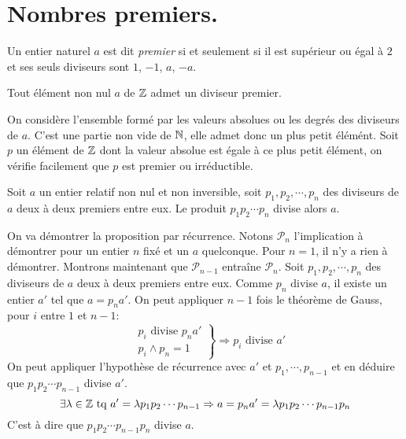 \section{Nombres premiers.}
\begin{defi}
 Un entier naturel $a$ est dit \emph{premier} si et seulement si il est supérieur ou égal à $2$ et ses seuls diviseurs sont $1$, $-1$, $a$, $-a$.
\end{defi}
\begin{prop}
 Tout élément non nul $a$ de $\mathbb{Z}$ admet un diviseur premier.
\end{prop}
\begin{demo}
 On considère l'ensemble formé par les valeurs absolues ou les degrés des diviseurs de $a$. C'est une partie non vide de $\mathbb{N}$, elle admet donc un plus petit élémént. Soit $p$ un élément de $\mathbb{Z}$ dont la valeur absolue est égale à ce plus petit élément, on vérifie facilement que $p$ est premier ou irréductible. 
\end{demo}
\begin{prop}
 Soit $a$ un entier relatif non  nul et non inversible, soit $p_1, p_2, \cdots, p_n$ des diviseurs de $a$ deux à deux premiers entre eux. Le produit $p_1p_2\cdots p_n$ divise alors $a$.
\end{prop}
\begin{demo}
On va démontrer la proposition par récurrence. Notons $\mathcal{P}_n$ l'implication à démontrer pour un entier $n$ fixé et un $a$ quelconque.\newline
Pour $n=1$, il n'y a rien à démontrer. Montrons maintenant que $\mathcal{P}_{n-1}$ entraîne $\mathcal{P}_n$.\newline
Soit $p_1, p_2, \cdots, p_n$ des diviseurs de $a$ deux à deux premiers entre eux. Comme $p_n$ divise $a$, il existe un entier $a'$ tel que $a=p_na'$. On peut appliquer $n-1$ fois le théorème de Gauss, pour $i$ entre $1$ et $n-1$:
\begin{displaymath}
\left. 
\begin{aligned}
&p_i \text{ divise } p_na'\\ &p_i \wedge p_n = 1  
\end{aligned}
\right\rbrace \Rightarrow p_i \text{ divise } a'
\end{displaymath}
On peut appliquer l'hypothèse de récurrence avec $a'$ et $p_1,\cdots, p_{n-1}$ et en déduire que $p_1p_2\cdots p_{n-1}$ divise $a'$.
\begin{displaymath}
  \exists \lambda \in \mathbb{Z} \text{ tq } a' = \lambda p_1p_2\cdots p_{n-1}
\Rightarrow a = p_n a' = \lambda p_1p_2\cdots p_{n-1} p_n
\end{displaymath}
C'est à dire que $p_1p_2\cdots p_{n-1} p_n$ divise $a$.
\end{demo}
